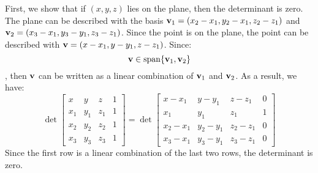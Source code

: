 \begin{sol}
    First, we show that if $(x,y,z)$ lies on the plane, then the determinant is zero. The plane can be described with the basis $\mathbf{v}_1 = (x_2-x_1,y_2-x_1,z_2-z_1)$ and $\mathbf{v}_2 = (x_3-x_1,y_3-y_1,z_3-z_1)$. Since the point is on the plane, the point can be described with $\mathbf{v} = (x-x_1, y-y_1, z-z_1)$. Since:
    \begin{equation}
        \mathbf{v} \in \mathrm{span}\{\mathbf{v}_1, \mathbf{v}_2\}
    \end{equation}
    , then $\mathbf{v}$ can be written as a linear combination of $\mathbf{v}_1$ and $\mathbf{v}_2$. As a result, we have:
    \begin{equation}
        \det \begin{bmatrix}
            x & y & z & 1 \\ 
            x_1 & y_1 & z_1 & 1 \\ 
            x_2 & y_2 & z_2 & 1 \\ 
            x_3 & y_3 & z_3 & 1 
        \end{bmatrix}
        = 
        \det \begin{bmatrix}
            x-x_1 & y-y_1 & z-z_1 & 0 \\ 
            x_1 & y_1 & z_1 & 1 \\ 
            x_2-x_1 & y_2-y_1 & z_2-z_1 & 0 \\ 
            x_3-x_1 & y_3-y_1 & z_3-z_1 & 0
        \end{bmatrix}
    \end{equation}
    Since the first row is a linear combination of the last two rows, the determinant is zero.
    \vspace{2mm}


\end{sol}
